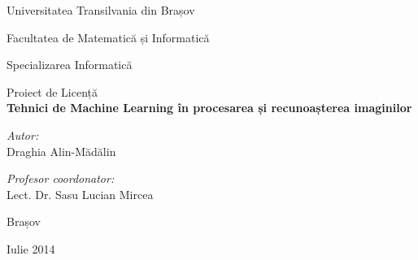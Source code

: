 \pagestyle{empty}

\begin{titlepage}

\begin{center}

\Large Universitatea Transilvania din Brașov

\Large Facultatea de Matematică și Informatică

\large Specializarea Informatică

\vfill
\Large Proiect de Licență\\[0.3cm]
 
{ \Huge \bfseries Tehnici de Machine Learning în procesarea și recunoașterea imaginilor}\\[2cm]
 
\begin{minipage}{0.4\textwidth}
\begin{flushleft} \large
\emph{Autor:}\\
Draghia Alin-Mădălin
\end{flushleft}
\end{minipage}
\begin{minipage}{0.5\textwidth}
\begin{flushright} \large
\emph{Profesor coordonator:} \\
Lect. Dr. Sasu Lucian Mircea
\end{flushright}
\end{minipage}
 
\vfill

{\Large Brașov}

{\large Iulie 2014}
 
\end{center}
 
\end{titlepage}
\pagestyle{fancy}